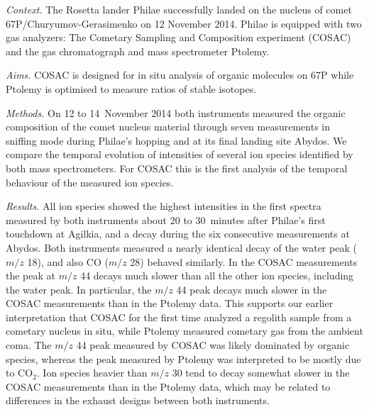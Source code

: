 \documentclass{aa}
\begin{document}
\abstract
{

{\sf \em Context.} The Rosetta lander Philae successfully landed on the nucleus of comet 67P/Churyumov-Gerasimenko on 12 November 2014.
Philae is equipped with two gas analyzers: The Cometary Sampling and Composition experiment (COSAC)   
and the gas chromatograph and mass spectrometer Ptolemy. 

{\sf \em Aims.}
 COSAC is designed for in situ analysis of organic molecules on 67P while Ptolemy is 
optimised to measure ratios of stable isotopes.

{\sf \em Methods.}
On 12 to 14~November 2014
both instruments measured the organic composition of the comet nucleus material through seven 
measurements in sniffing mode during Philae's hopping and at its final 
landing site Abydos.  
We  compare the temporal evolution of intensities of several ion species identified by both mass spectrometers.
 For COSAC this is the first analysis of the temporal behaviour of the measured ion species.

{\sf \em Results.}
All ion species showed the highest intensities in the first spectra measured by both instruments 
about 20 to 30~minutes after
Philae's first touchdown at Agilkia, and a decay during the six consecutive measurements at Abydos. 
Both instruments measured a nearly identical decay of the water peak ($m/z$ 18), and also CO 
($m/z$ 28) behaved similarly. 
In the COSAC measurements the peak at $m/z$ 44 decays much slower than all the other ion species, including 
the water peak.  In particular, the $m/z$ 44 peak decays much slower in the COSAC measurements
than in the Ptolemy data. This supports our earlier interpretation that COSAC 
for the first time analyzed a  regolith sample from a cometary nucleus in situ, while Ptolemy
measured cometary gas from the ambient coma. The $m/z$ 44 peak measured by COSAC  
was  likely dominated by  organic species, whereas the peak measured by Ptolemy was 
interpreted to be mostly due to $\mathrm{CO_2}$. Ion species heavier than $m/z$ 30 tend to decay somewhat slower in the
COSAC measurements than in the Ptolemy data, which may be related to differences in the
exhaust designs between both instruments. 
}



\maketitle
\end{document}
